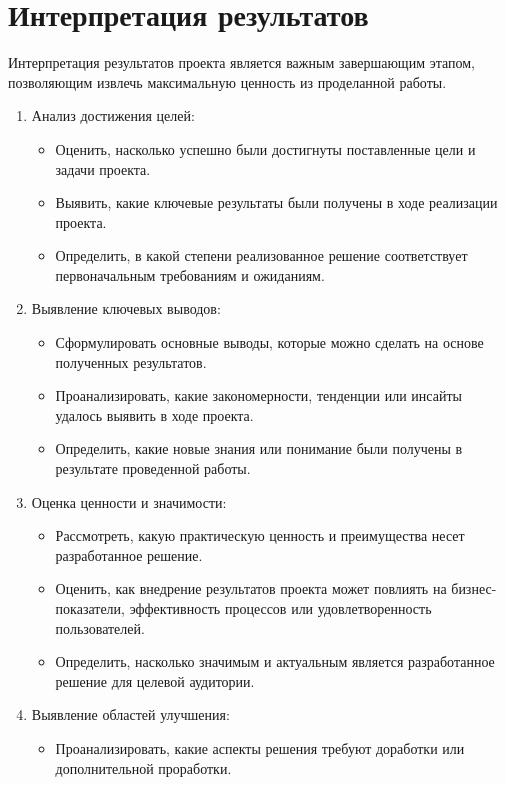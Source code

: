 \section{Интерпретация результатов}
Интерпретация результатов проекта является важным завершающим этапом, позволяющим извлечь максимальную ценность из проделанной работы.
\begin{enumerate}
    \item Анализ достижения целей:
        \begin{itemize}
            \item Оценить, насколько успешно были достигнуты поставленные цели и задачи проекта.
            \item Выявить, какие ключевые результаты были получены в ходе реализации проекта.
            \item Определить, в какой степени реализованное решение соответствует первоначальным требованиям и ожиданиям.
        \end{itemize}
    \item Выявление ключевых выводов:
        \begin{itemize}
            \item Сформулировать основные выводы, которые можно сделать на основе полученных результатов.
            \item Проанализировать, какие закономерности, тенденции или инсайты удалось выявить в ходе проекта.
            \item Определить, какие новые знания или понимание были получены в результате проведенной работы.
        \end{itemize}
    \item Оценка ценности и значимости:
        \begin{itemize}
            \item Рассмотреть, какую практическую ценность и преимущества несет разработанное решение.
            \item Оценить, как внедрение результатов проекта может повлиять на бизнес-показатели, эффективность процессов или удовлетворенность пользователей.
            \item Определить, насколько значимым и актуальным является разработанное решение для целевой аудитории.
        \end{itemize}
    \item Выявление областей улучшения:
        \begin{itemize}
            \item Проанализировать, какие аспекты решения требуют доработки или дополнительной проработки.

\end{itemize}
\end{enumerate}
